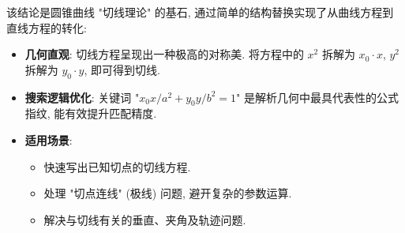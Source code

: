 \begin{explanationbox}
该结论是圆锥曲线 "切线理论" 的基石, 通过简单的结构替换实现了从曲线方程到直线方程的转化:
\begin{itemize}
    \item \textbf{几何直观}: 切线方程呈现出一种极高的对称美. 将方程中的 $x^2$ 拆解为 $x_0 \cdot x$, $y^2$ 拆解为 $y_0 \cdot y$, 即可得到切线.
    \item \textbf{搜索逻辑优化}: 关键词 "$x_0x/a^2 + y_0y/b^2 = 1$" 是解析几何中最具代表性的公式指纹, 能有效提升匹配精度.
    \item \textbf{适用场景}:
    \begin{itemize}
        \item 快速写出已知切点的切线方程.
        \item 处理 "切点连线" (极线) 问题, 避开复杂的参数运算.
        \item 解决与切线有关的垂直、夹角及轨迹问题.
    \end{itemize}
\end{itemize}
\end{explanationbox}